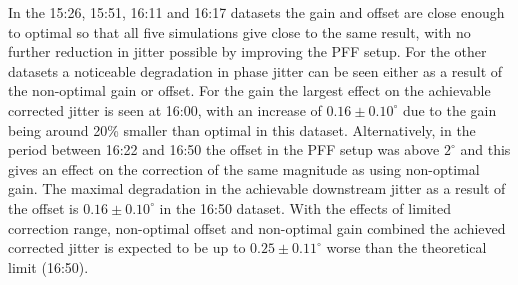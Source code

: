 In the 15:26, 15:51, 16:11 and 16:17 datasets the gain and offset are close enough to optimal so that all five simulations give close to the same result, with no further reduction in jitter possible by improving the PFF setup. 
For the other datasets a noticeable degradation in phase jitter can be seen either as a result of the non-optimal gain or offset.
For the gain the largest effect on the achievable corrected jitter is seen at 16:00, with an increase of \(0.16\pm0.10^\circ\) due to the gain being around 20\% smaller than optimal in this dataset. 
Alternatively, in the period between 16:22 and 16:50 the offset in the PFF setup was above \(2^\circ\) and this gives an effect on the correction of the same magnitude as using non-optimal gain. The maximal degradation in the achievable downstream jitter as a result of the offset is \(0.16\pm0.10^\circ\) in the 16:50 dataset. 
With the effects of limited correction range, non-optimal offset and non-optimal gain combined the achieved corrected jitter is expected to be up to \(0.25\pm0.11^\circ\) worse than the theoretical limit (16:50).%

